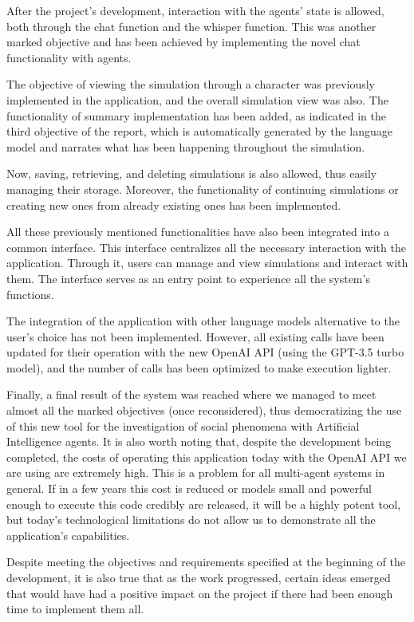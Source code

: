 After the project's development, interaction with the agents' state is allowed, both through the chat function and the whisper function. This was another marked objective and has been achieved by implementing the novel chat functionality with agents.

The objective of viewing the simulation through a character was previously implemented in the application, and the overall simulation view was also. The functionality of summary implementation has been added, as indicated in the third objective of the report, which is automatically generated by the language model and narrates what has been happening throughout the simulation.

Now, saving, retrieving, and deleting simulations is also allowed, thus easily managing their storage. Moreover, the functionality of continuing simulations or creating new ones from already existing ones has been implemented.

All these previously mentioned functionalities have also been integrated into a common interface. This interface centralizes all the necessary interaction with the application. Through it, users can manage and view simulations and interact with them. The interface serves as an entry point to experience all the system's functions.

The integration of the application with other language models alternative to the user's choice has not been implemented. However, all existing calls have been updated for their operation with the new OpenAI API (using the GPT-3.5 turbo model), and the number of calls has been optimized to make execution lighter.

Finally, a final result of the system was reached where we managed to meet almost all the marked objectives (once reconsidered), thus democratizing the use of this new tool for the investigation of social phenomena with Artificial Intelligence agents. It is also worth noting that, despite the development being completed, the costs of operating this application today with the OpenAI API we are using are extremely high. This is a problem for all multi-agent systems in general. If in a few years this cost is reduced or models small and powerful enough to execute this code credibly are released, it will be a highly potent tool, but today's technological limitations do not allow us to demonstrate all the application's capabilities.


Despite meeting the objectives and requirements specified at the beginning of the development, it is also true that as the work progressed, certain ideas emerged that would have had a positive impact on the project if there had been enough time to implement them all.

